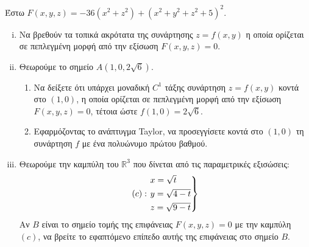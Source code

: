 \documentclass[a4paper,table]{report}
\begin{document}
\begin{mybox3}
  \begin{thema}
    Έστω $ F(x,y,z) = -36(x^{2}+z^{2}) + (x^{2}+y^{2}+z^{2}+5)^2 $.
    \begin{enumerate}[i)]
      \item Να βρεθούν τα τοπικά ακρότατα της συνάρτησης $ z=f(x,y) $ η οποία ορίζεται σε
        πεπλεγμένη μορφή από την εξίσωση $ F(x,y,z)=0 $.
      \item Θεωρούμε το σημείο $ A(1,0,2 \sqrt{6}) $.
        \begin{enumerate}
          \item Να δείξετε ότι υπάρχει μοναδική $ C^{1} $ τάξης συνάρτηση $ z=f(x,y) $ 
            κοντά στο $ (1,0) $, η οποία ορίζεται σε πεπλεγμένη μορφή από την εξίσωση $
            F(x,y,z)=0 $, τέτοια ώστε $ f(1,0) = 2 \sqrt{6} $.
          \item Εφαρμόζοντας το ανάπτυγμα Taylor, να προσεγγίσετε κοντά στο $ (1,0) $ 
            τη συνάρτηση $f$ με ένα πολυώνυμο πρώτου βαθμού.
        \end{enumerate}
      \item Θεωρούμε την καμπύλη του $ \mathbb{R}^{3} $ που δίνεται από τις παραμετρικές
        εξισώσεις:
        \[
          (c): \begin{rcases}
            x = \sqrt{t} \\
            y= \sqrt{4-t} \\
            z= \sqrt{9-t}
          \end{rcases}
        \] 
        Αν $B$ είναι το σημείο τομής της επιφάνειας $ F(x,y,z)=0 $ με την καμπύλη $ (c)
        $, να βρείτε το εφαπτόμενο επίπεδο αυτής της επιφάνειας στο σημείο $ B $.
    \end{enumerate}
  \end{thema}
\end{mybox3}
\end{document}
